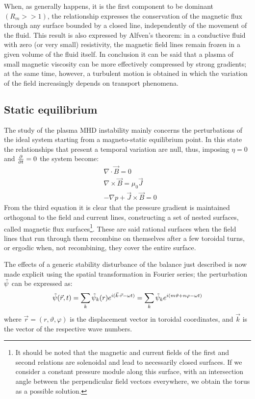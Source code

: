 When, as generally happens, it is the first component to be dominant $(R_m >> 1)$, the relationship expresses the conservation of the magnetic flux through any surface bounded by a closed line, independently of the movement of the fluid. This result is also expressed by Alfven's theorem: in a conductive fluid with zero (or very small) resistivity, the magnetic field lines remain frozen in a given volume of the fluid itself.
In conclusion it can be said that a plasma of small magnetic viscosity can be more effectively compressed by strong gradients; at the same time, however, a turbulent motion is obtained in which the variation of the field increasingly depends on transport phenomena.




\subsection{Static equilibrium}
The study of the plasma MHD instability mainly concerns the perturbations of the ideal system starting from a magneto-static equilibrium point. In this state the relationships that present a temporal variation are null, thus, imposing $\eta=0$ and $\pdv{}{t} = 0$ the system become:
\begin{align}
    & \nabla \cdot \Vec{B} = 0 \\
    & \nabla \times \Vec{B} = \mu_0 \Vec{J} \\
    & -\nabla p + \Vec{J} \times \Vec{B} = 0
\end{align}
From the third equation it is clear that the pressure gradient is maintained orthogonal to the field and current lines, constructing a set of nested surfaces, called magnetic flux surfaces\footnote{It should be noted that the magnetic and current fields of the first and second relations are solenoidal and lead to necessarily closed surfaces. If we consider a constant pressure module along this surface, with an intersection angle between the perpendicular field vectors everywhere, we obtain the torus as a possible solution.}. These are said rational surfaces when the field lines that run through them recombine on themselves after a few toroidal turns, or ergodic when, not recombining, they cover the entire surface.

The effects of a generic stability disturbance of the balance just described is now made explicit using the spatial transformation in Fourier series; the perturbation $\Tilde{\psi}$ can be expressed as:
\begin{equation}
    \Tilde{\psi}(\Vec{r},t) = \sum_k \Tilde{\psi}_k(r) e^{i(\Vec{k}\cdot\Vec{r}-\omega t)} = \sum_k \Tilde{\psi}_k e^{i(m\vartheta+n\varphi-\omega t)}
\end{equation}
where $\Vec{r} = (r,\vartheta,\varphi)$ is the displacement vector in toroidal coordinates, and $\Vec{k}$ is the vector of the respective wave numbers.

